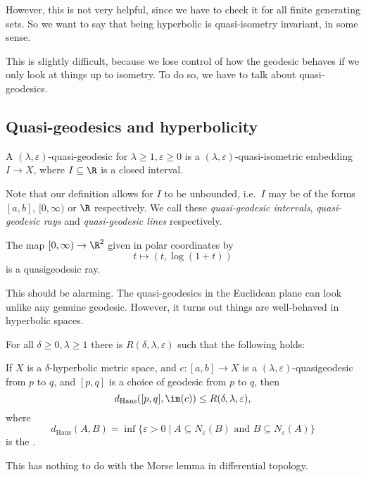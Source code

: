 \documentclass[a4paper]{article}
\begin{document}
However, this is not very helpful, since we have to check it for all finite generating sets. So we want to say that being hyperbolic is quasi-isometry invariant, in some sense.

This is slightly difficult, because we lose control of how the geodesic behaves if we only look at things up to isometry. To do so, we have to talk about quasi-geodesics.

\subsection{Quasi-geodesics and hyperbolicity}
\begin{defi}
  A $(\lambda, \varepsilon)$-quasi-geodesic for $\lambda \geq 1, \varepsilon \geq 0$ is a $(\lambda, \varepsilon)$-quasi-isometric embedding $I \to X$, where $I \subseteq \R$ is a closed interval.
\end{defi}
Note that our definition allows for $I$ to be unbounded, i.e.\ $I$ may be of the forms $[a, b]$, $[0, \infty)$ or $\R$ respectively. We call these \emph{quasi-geodesic intervals}, \emph{quasi-geodesic rays} and \emph{quasi-geodesic lines} respectively.

\begin{eg}
  The map $[0, \infty) \to \R^2$ given in polar coordinates by
  \[
    t \mapsto (t, \log(1 + t))
  \]
  is a quasigeodesic ray.
\end{eg}
This should be alarming. The quasi-geodesics in the Euclidean plane can look unlike any genuine geodesic. However, it turns out things are well-behaved in hyperbolic spaces.

\begin{thm}
  For all $\delta \geq 0, \lambda \geq 1$ there is $R(\delta, \lambda, \varepsilon)$ such that the following holds:

  If $X$ is a $\delta$-hyperbolic metric space, and $c: [a, b] \to X$ is a $(\lambda, \varepsilon)$-quasigeodesic from $p$ to $q$, and $[p, q]$ is a choice of geodesic from $p$ to $q$, then
  \[
    d_{\mathrm{Haus}}([p, q], \im(c)) \leq R(\delta, \lambda, \varepsilon),
  \]
  where
  \[
    d_{\mathrm{Haus}}(A, B) = \inf\{\varepsilon > 0 \mid A \subseteq N_\varepsilon(B) \text{ and }B \subseteq N_\varepsilon(A)\}
  \]
  is the .
\end{thm}
This has nothing to do with the Morse lemma in differential topology.
\end{document}
